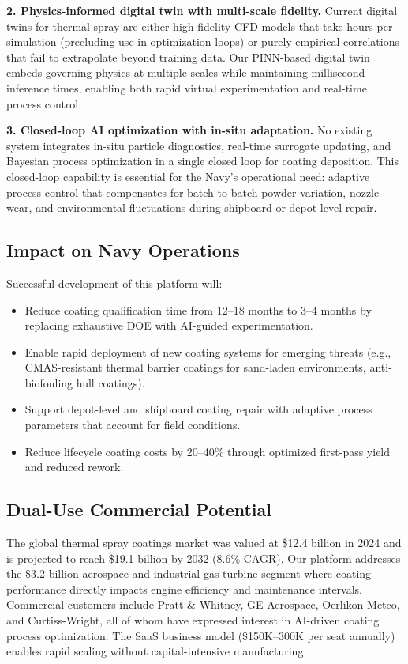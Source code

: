 \documentclass[11pt,letterpaper]{article}
\begin{document}
\textbf{2. Physics-informed digital twin with multi-scale fidelity.}
Current digital twins for thermal spray are either high-fidelity CFD
models that take hours per simulation (precluding use in optimization
loops) or purely empirical correlations that fail to extrapolate beyond
training data. Our PINN-based digital twin embeds governing physics at
multiple scales while maintaining millisecond inference times, enabling
both rapid virtual experimentation and real-time process control.

\textbf{3. Closed-loop AI optimization with in-situ adaptation.}
No existing system integrates in-situ particle diagnostics, real-time
surrogate updating, and Bayesian process optimization in a single
closed loop for coating deposition. This closed-loop capability is
essential for the Navy's operational need: adaptive process control that
compensates for batch-to-batch powder variation, nozzle wear, and
environmental fluctuations during shipboard or depot-level repair.

\subsection{Impact on Navy Operations}

Successful development of this platform will:
\begin{itemize}[nosep]
  \item Reduce coating qualification time from 12--18 months to 3--4
        months by replacing exhaustive DOE with AI-guided experimentation.
  \item Enable rapid deployment of new coating systems for emerging
        threats (e.g., CMAS-resistant thermal barrier coatings for
        sand-laden environments, anti-biofouling hull coatings).
  \item Support depot-level and shipboard coating repair with adaptive
        process parameters that account for field conditions.
  \item Reduce lifecycle coating costs by 20--40\% through optimized
        first-pass yield and reduced rework.
\end{itemize}

\subsection{Dual-Use Commercial Potential}

The global thermal spray coatings market was valued at \$12.4 billion in
2024 and is projected to reach \$19.1 billion by 2032 (8.6\% CAGR). Our
platform addresses the \$3.2 billion aerospace and industrial gas turbine
segment where coating performance directly impacts engine efficiency and
maintenance intervals. Commercial customers include Pratt \& Whitney,
GE Aerospace, Oerlikon Metco, and Curtiss-Wright, all of whom have
expressed interest in AI-driven coating process optimization. The SaaS
business model (\$150K--300K per seat annually) enables rapid scaling
without capital-intensive manufacturing.
\end{document}

